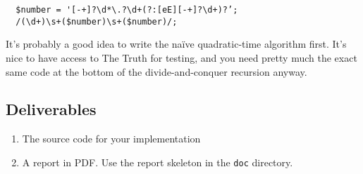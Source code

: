 \documentclass{tufte-handout}
\begin{document}
\begin{verbatim}
  $number = '[-+]?\d*\.?\d+(?:[eE][-+]?\d+)?’;
  /(\d+)\s+($number)\s+($number)/;
\end{verbatim}


It’s probably a good idea to write the naïve quadratic-time algorithm first.
It’s nice to have access to The Truth for testing, and you need pretty much the exact same code at the bottom of the divide-and-conquer recursion anyway.

 
\subsection{Deliverables}

\begin{enumerate}
  \item The source code for your implementation
  \item A report in PDF.
  Use the report skeleton in the {\tt doc} directory.
  \end{enumerate}
\end{document}
